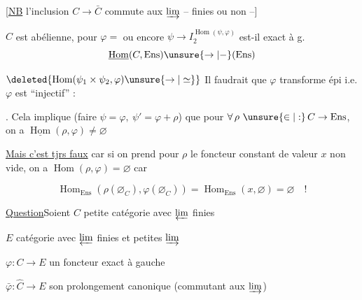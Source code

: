 [\uline{NB} l'inclusion $C\to\bar C$ commute aux $\varinjlim$  -- finies ou non --]

 $C$ est  abélienne, pour $\varphi=$ ou encore $\psi\to I_2^{\operatorname{Hom}(\psi,\varphi)}$ est-il exact à g.
\[\underline{\operatorname{Hom}}(C,\mathrm{Ens})\unsure{\to|{-}}(\mathrm{Ens})\]

$\deleted{\operatorname{Hom}(\psi_1\times\psi_2,\varphi)\unsure{\to|\simeq}}$ Il faudrait que $\varphi$ transforme    épi i.e. $\varphi$ est ``injectif'' :


. Cela implique (faire $\psi=\varphi,\ \psi'=\varphi+\rho$) que pour $\forall\,\rho\ \unsure{\in|:}\, C\to\mathrm{Ens}$, on a $\underline{\operatorname{Hom}}(\rho,\varphi)\ne\varnothing$

\diagram{\begin{tikzcd}[ampersand replacement=\&]\varphi\arrow[r]\arrow[dr,equal]\&\varphi\amalg\psi\arrow[d,dashed]\\\&\varphi\end{tikzcd}}

 \uline{Mais c'est tjrs faux}  car si on prend pour $\rho$ le foncteur constant de valeur $x$ non vide, on a $\operatorname{Hom}(\rho,\varphi)=\varnothing$ car

\[\operatorname{Hom}_{\mathrm{Ens}}(\rho(\varnothing_C),\varphi(\varnothing_C))=\operatorname{Hom}_{\mathrm{Ens}}(x,\varnothing)=\varnothing\quad !\]

\uline{Question}\qquad Soient $C$ petite catégorie avec $\varprojlim$ finies

$E$ catégorie avec $\varprojlim$ finies et petites $\varinjlim$

$\varphi:C\to E$ un foncteur exact à gauche

$\bar\varphi:\hat C\to E$ son prolongement canonique (commutant aux  $\varinjlim$)

